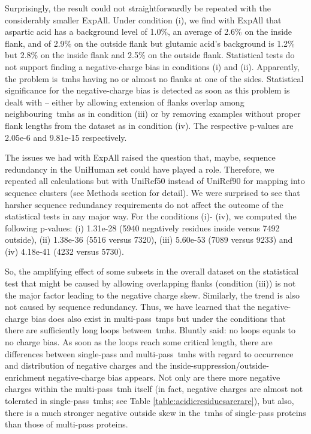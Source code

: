 Surprisingly, the result could not straightforwardly be repeated with the considerably smaller ExpAll.
Under condition (i), we find with ExpAll that aspartic acid has a background level of 1.0\%, an average of 2.6\% on the inside flank, and of 2.9\% on the outside flank but glutamic acid’s background is 1.2\% but 2.8\% on the inside flank and 2.5\% on the outside flank.
Statistical tests do not support finding a negative\--charge bias in conditions (i) and (ii).
Apparently, the problem is~\gls{tmh}s having no or almost no flanks at one of the sides.
Statistical significance for the negative\--charge bias is detected as soon as this problem is dealt with – either by allowing extension of flanks overlap among neighbouring~\gls{tmh}s as in condition (iii) or by removing examples without proper flank lengths from the dataset as in condition (iv).
The respective p\--values are 2.05e-6 and 9.81e-15 respectively.

The issues we had with ExpAll raised the question that, maybe, sequence redundancy in the UniHuman set could have played a role.
Therefore, we repeated all calculations but with UniRef50 instead of UniRef90 for mapping into sequence clusters (see Methods section for detail).
We were surprised to see that harsher sequence redundancy requirements do not affect the outcome of the statistical tests in any major way.
For the conditions (i)- (iv), we computed the following p\--values: (i) 1.31e-28 (5940 negatively residues inside versus 7492 outside), (ii) 1.38e-36 (5516 versus 7320), (iii) 5.60e-53 (7089 versus 9233) and (iv) 4.18e-41 (4232 versus 5730).

So, the amplifying effect of some subsets in the overall dataset on the statistical test that might be caused by allowing overlapping flanks (condition (iii)) is not the major factor leading to the negative charge skew.
Similarly, the trend is also not caused by sequence redundancy.
Thus, we have learned that the negative\--charge bias does also exist in multi\--pass~\gls{tmp}s but under the conditions that there are sufficiently long loops between~\gls{tmh}s.
Bluntly said: no loops equals to no charge bias.
As soon as the loops reach some critical length, there are differences between single\--pass and multi\--pass~\gls{tmh}s with regard to occurrence and distribution of negative charges and the inside-suppression/outside-enrichment negative\--charge bias appears.
Not only are there more negative charges within the multi\--pass~\gls{tmh} itself (in fact, negative charges are almost not tolerated in single\--pass~\gls{tmh}s; see Table \ref{table:acidicresiduesarerare}), but also, there is a much stronger negative outside skew in the~\gls{tmh}s of single\--pass proteins than those of multi\--pass proteins.

